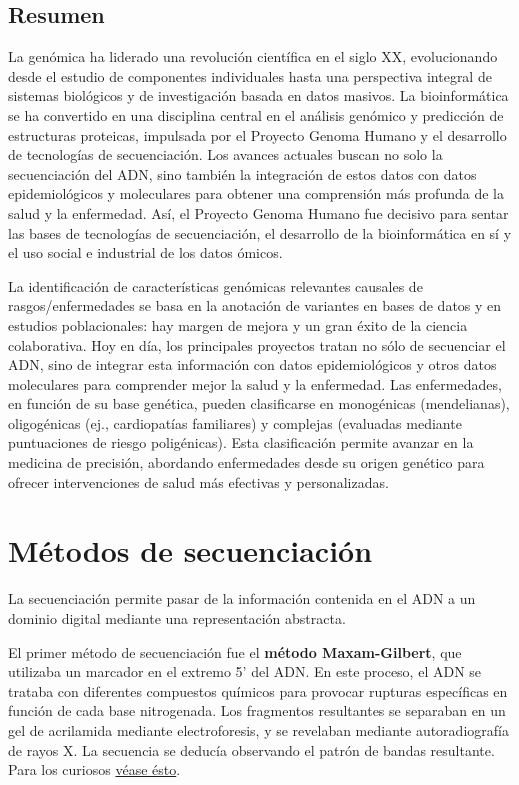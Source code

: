 \section{Resumen}
La genómica ha liderado una revolución científica en el siglo XX, evolucionando desde el estudio de componentes individuales hasta una perspectiva integral de sistemas biológicos y de investigación basada en datos masivos. La bioinformática se ha convertido en una disciplina central en el análisis genómico y predicción de estructuras proteicas, impulsada por el Proyecto Genoma Humano y el desarrollo de tecnologías de secuenciación. Los avances actuales buscan no solo la secuenciación del ADN, sino también la integración de estos datos con datos epidemiológicos y moleculares para obtener una comprensión más profunda de la salud y la enfermedad. Así, el Proyecto Genoma Humano fue decisivo para sentar las bases de tecnologías de secuenciación, el desarrollo de la bioinformática en sí y el uso social e industrial de los datos ómicos.

La identificación de características genómicas relevantes causales de rasgos/enfermedades se basa en la anotación de variantes en bases de datos y en estudios poblacionales: hay margen de mejora y un gran éxito de la ciencia colaborativa. Hoy en día, los principales proyectos tratan no sólo de secuenciar el ADN, sino de integrar esta información con datos epidemiológicos y otros datos moleculares para comprender mejor la salud y la enfermedad.
Las enfermedades, en función de su base genética, pueden clasificarse en monogénicas (mendelianas), oligogénicas (ej., cardiopatías familiares) y complejas (evaluadas mediante puntuaciones de riesgo poligénicas). Esta clasificación permite avanzar en la medicina de precisión, abordando enfermedades desde su origen genético para ofrecer intervenciones de salud más efectivas y personalizadas.

\chapter{Métodos de secuenciación}
La secuenciación permite pasar de la información contenida en el ADN a un dominio digital mediante una representación abstracta. 

El primer método de secuenciación fue el \textbf{método Maxam-Gilbert}, que utilizaba un marcador en el extremo 5' del ADN. En este proceso, el ADN se trataba con diferentes compuestos químicos para provocar rupturas específicas en función de cada base nitrogenada. Los fragmentos resultantes se separaban en un gel de acrilamida mediante electroforesis, y se revelaban mediante autoradiografía de rayos X. La secuencia se deducía observando el patrón de bandas resultante. Para los curiosos \href{https://www.youtube.com/watch?v=_B5Dj8PL4E0}{véase ésto}.

